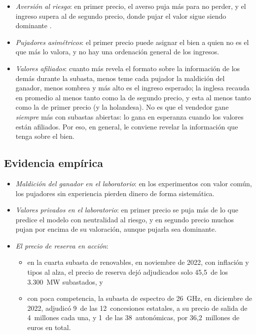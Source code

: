 \documentclass[11pt]{article}
\begin{document}
\begin{itemize}
\item \emph{Aversión al riesgo}: en primer precio, el averso puja más para no perder, y el ingreso supera al de segundo precio, donde pujar el valor sigue siendo dominante\nocite{Holt1980Competitive,MaskinRiley1984Optimal} .
\item \emph{Pujadores asimétricos}: el primer precio puede asignar el bien a quien no es el que más lo valora, y no hay una ordenación general de los ingresos\nocite{MaskinRiley2000Asymmetric}.
\item \emph{Valores afiliados}\nocite{MilgromWeber1982Theory}: cuanto más revela el formato sobre la información de los demás durante la subasta, menos teme cada pujador la maldición del ganador, menos sombrea y más alto es el ingreso esperado; la inglesa recauda en promedio al menos tanto como la de segundo precio, y esta al menos tanto como la de primer precio (y la holandesa)\nocite{Nobel2020Scientific}. No es que el vendedor gane \emph{siempre} más con subastas abiertas: lo gana en esperanza cuando los valores están afiliados. Por eso, en general, le conviene revelar la información que tenga sobre el bien.
\end{itemize}

\subsection*{Evidencia empírica}

\begin{itemize}
\item \emph{Maldición del ganador en el laboratorio}: en los experimentos con valor común, los pujadores sin experiencia pierden dinero de forma sistemática\nocite{KagelLevin1986Winners}.
\item \emph{Valores privados en el laboratorio}: en primer precio se puja más de lo que predice el modelo con neutralidad al riesgo, y en segundo precio muchos pujan por encima de su valoración, aunque pujarla sea dominante\nocite{KagelLevin1993Independent}.
\item \emph{El precio de reserva en acción}:
  \begin{itemize}
  \item en la cuarta subasta de renovables, en noviembre de 2022, con inflación y tipos al alza, el precio de reserva dejó adjudicados solo 45,5~de los 3.300~MW subastados\nocite{MITECO2022CuartaSubasta}, y
  \item con poca competencia, la subasta de espectro de 26~GHz, en diciembre de 2022, adjudicó 9~de las 12~concesiones estatales, a su precio de salida de 4~millones cada una, y 1~de las 38~autonómicas, por 36,2~millones de euros en total\nocite{MINECO2022Subasta26GHz,BOE2023ETD114}.
  \end{itemize}
\end{itemize}
\end{document}

